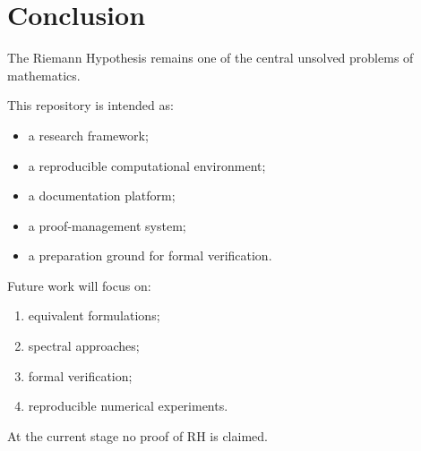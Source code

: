 \section{Conclusion}

The Riemann Hypothesis remains one of the central unsolved problems of mathematics.

This repository is intended as:

\begin{itemize}
\item a research framework;
\item a reproducible computational environment;
\item a documentation platform;
\item a proof-management system;
\item a preparation ground for formal verification.
\end{itemize}

Future work will focus on:

\begin{enumerate}
\item equivalent formulations;
\item spectral approaches;
\item formal verification;
\item reproducible numerical experiments.
\end{enumerate}

At the current stage no proof of RH is claimed.